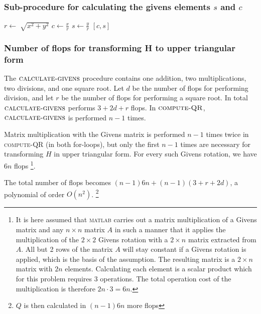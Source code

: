 \subsubsection*{Sub-procedure for calculating the givens elements $s$ and $c$}
\begin{algorithmic}
\State $r \gets \sqrt[]{x^2+y^2 }$ 
\State $c \gets \frac{x}{r} $
\State $s \gets \frac{y}{r} $
\State \Return $[c, s]$
\EndFunction
\end{algorithmic}

\subsubsection*{Number of flops for transforming H to upper triangular form}
The $\textsc{calculate-givens}$ procedure contains one addition, two multiplications, two divisions, and one square root. 
Let $d$ be the number of flops for performing division, and let $r$ be the number of flops for performing a square root. 
In total $\textsc{calculate-givens}$ performs $3+2d+r$ flops. In $\textsc{compute-QR}$, $\textsc{calculate-givens}$ is performed $n-1$ times. 

Matrix multiplication with the Givens matrix is performed $n-1$ times twice in \textsc{compute-QR} (in both for-loops), but only the first $n-1$ times are necessary for transforming $H$ in upper triangular form. 
For every such Givens rotation, we have $6n$ flops \footnote{
It is here assumed that \textsc{matlab} carries out a matrix multiplication of a Givens matrix and any $n \times n$ matrix $A$ in such a manner that it applies the multiplication of the $2\times2$ Givens rotation with a $2\times n$ matrix extracted from $A$. 
All but 2 rows of the matrix $A$ will stay constant if a Givens rotation is applied, which is the basis of the assumption. 
The resulting matrix is a $2\times n$ matrix with $2n$ elements. 
Calculating each element is a scalar product which for this problem requires 3 operations. 
The total operation cost of the multiplication is therefore $2n\cdot 3=6n$. 
}. 

The total number of flops becomes $(n-1)6n+(n-1)(3+r+2d)$, a polynomial of order $O(n^2)$.
\footnote{$Q$ is then calculated in $(n-1)6n$ more flops}

